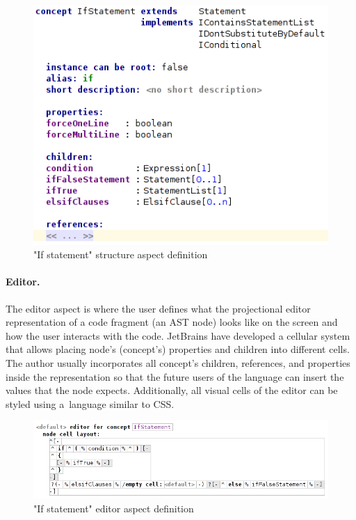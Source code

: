 \begin{figure}[ht]
	\centering
	\includegraphics[scale=0.55]{./images/if_statement_structure.png}
	\caption{"If statement" structure aspect definition}
	\label{fig:if_statement_structure}
\end{figure}

\paragraph{Editor.}
The editor aspect is where the user defines what the projectional editor representation of a code fragment (an AST node) looks like on the screen and how the user interacts with the code. JetBrains have developed a cellular system that allows placing node's (concept's) properties and children into different cells. The author usually incorporates all concept's children, references, and properties inside the representation so that the future users of the language can insert the values that the node expects. Additionally, all visual cells of the editor can be styled using a~language similar to CSS.

\begin{figure}[ht]
	\centering
	\includegraphics[scale=0.5]{./images/if_statement_editor_definition.png}
	\caption{"If statement" editor aspect definition}
	\label{fig:if_editor_definition}
\end{figure}

